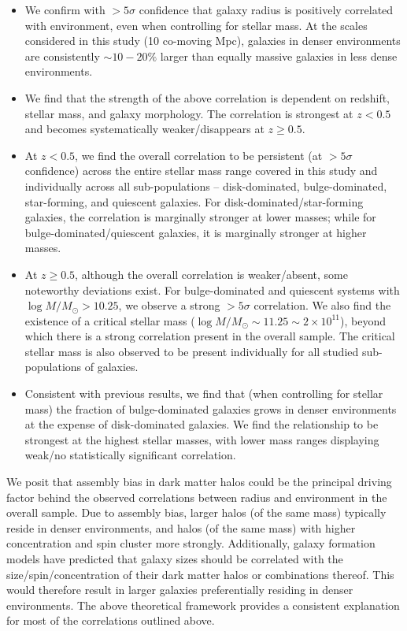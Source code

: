 \begin{itemize}
    \item We confirm with $>5\sigma$ confidence that galaxy radius is positively correlated with environment, even when controlling for stellar mass. At the scales considered in this study (10 co-moving Mpc), galaxies in denser environments are consistently $\sim10-20\%$ larger than equally massive galaxies in less dense environments. 
    \item We find that the strength of the above correlation is dependent on redshift, stellar mass, and galaxy morphology. The correlation is strongest at $z < 0.5$ and becomes systematically weaker/disappears at $z \geq 0.5$.
    \item At $z < 0.5$, we find the overall correlation to be persistent (at $>5\sigma$ confidence) across the entire stellar mass range covered in this study and individually across all sub-populations -- disk-dominated, bulge-dominated, star-forming, and quiescent galaxies. For disk-dominated/star-forming galaxies, the correlation is marginally stronger at lower masses; while for bulge-dominated/quiescent galaxies, it is marginally stronger at higher masses. 
    \item At $z\geq0.5$, although the overall correlation is weaker/absent, some noteworthy deviations exist. For bulge-dominated and quiescent systems with $\log M/M_{\odot} > 10.25$, we observe a strong $>5\sigma$ correlation. We also find the existence of a critical stellar mass ($\log M/M_{\odot} \sim 11.25 \sim 2\times 10^{11}$), beyond which there is a strong correlation present in the overall sample. The critical stellar mass is also observed to be present individually for all studied sub-populations of galaxies. 
    \item Consistent with previous results, we find that (when controlling for stellar mass) the fraction of bulge-dominated galaxies grows in denser environments at the expense of disk-dominated galaxies. We find the relationship to be strongest at the highest stellar masses, with lower mass ranges displaying weak/no statistically significant correlation.
\end{itemize}

We posit that assembly bias in dark matter halos could be the principal driving factor behind the observed correlations between radius and environment in the overall sample. Due to assembly bias, larger halos (of the same mass) typically reside in denser environments, and  halos (of the same mass) with higher concentration and spin cluster more strongly. Additionally, galaxy formation models have predicted that galaxy sizes should be correlated with the size/spin/concentration of their dark matter halos or combinations thereof. This would therefore result in larger galaxies preferentially residing in denser environments. The above theoretical framework provides a consistent explanation for most of the correlations outlined above.

